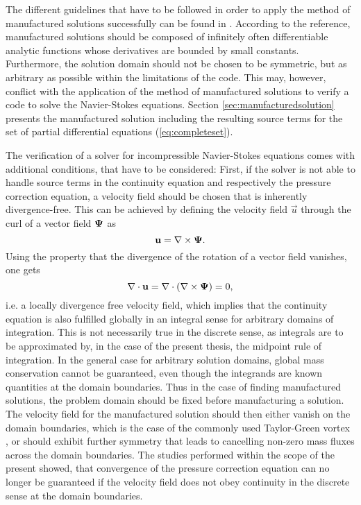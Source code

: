 The different guidelines that have to be followed in order to apply the method of manufactured solutions successfully can be found in \cite{salari00}. According to the reference, manufactured solutions should be composed of infinitely often differentiable analytic functions whose derivatives are bounded by small constants. Furthermore, the solution domain should not be chosen to be symmetric, but as arbitrary as possible within the limitations of the code. This may, however, conflict with the application of the method of manufactured solutions to verify a code to solve the Navier-Stokes equations. Section \ref{sec:manufacturedsolution} presents the manufactured solution including the resulting source terms for the set of partial differential equations (\ref{eq:completeset}).

The verification of a solver for incompressible Navier-Stokes equations comes with additional conditions, that have to be considered: First, if the solver is not able to handle source terms in the continuity equation and respectively the pressure correction equation, a velocity field should be chosen that is inherently divergence-free. This can be achieved by defining the velocity field \(\vec{u}\) through the curl of a vector field \(\boldsymbol{\Psi}\) as
\begin{displaymath}
  \mathbf{u} = \nabla \times \boldsymbol{\Psi}.
\end{displaymath}
Using the property that the divergence of the rotation of a vector field vanishes, one gets
\begin{displaymath}
  \nabla \cdot \mathbf{u} = \nabla \cdot \left( \nabla \times \boldsymbol{\Psi}\right) = 0,
\end{displaymath}
i.e. a locally divergence free velocity field, which implies that the continuity equation is also fulfilled globally in an integral sense for arbitrary domains of integration. This is not necessarily true in the discrete sense, as integrals are to be approximated by, in the case of the present thesis, the midpoint rule of integration. In the general case for arbitrary solution domains, global mass conservation cannot be guaranteed, even though the integrands are known quantities at the domain boundaries. Thus in the case of finding manufactured solutions, the problem domain should be fixed before manufacturing a solution. The velocity field for the manufactured solution should then either vanish on the domain boundaries, which is the case of the commonly used Taylor-Green vortex \cite{taylor37}, or should exhibit further symmetry that leads to cancelling non-zero mass fluxes across the domain boundaries. The studies performed within the scope of the present showed, that convergence of the pressure correction equation can no longer be guaranteed if the velocity field does not obey continuity in the discrete sense at the domain boundaries.

